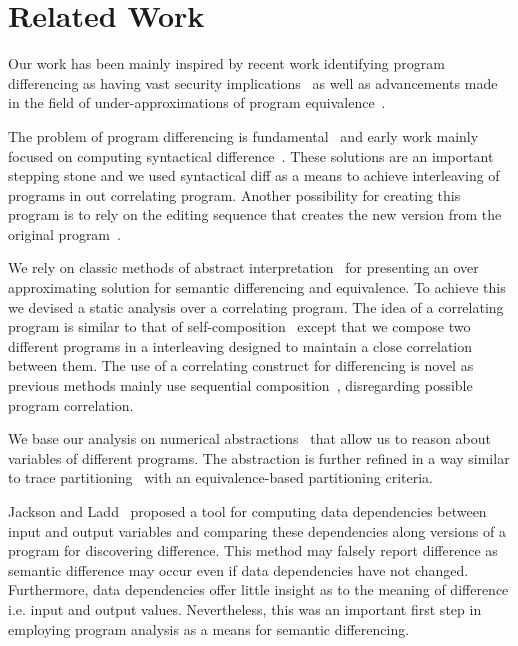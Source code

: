 \section{Related Work} 

Our work has been mainly inspired by recent work identifying program differencing as having vast security implications~\cite{BrumleyPoosankamSongZheng08,SongSunZhang09} as well as advancements made in the field of under-approximations of program equivalence~\cite{GodlinStrichman09,KawaguchiLahiriRebelo10,DwyerElbaumPerson08,EnglerRamos11}.

The problem of program differencing is fundamental~\cite{Hoare69} and early work mainly focused on computing syntactical difference~\cite{HuntMcIlroy75}. These solutions are an important stepping stone and we used syntactical diff as a means to achieve interleaving of programs in out correlating program. Another possibility for creating this program is to rely on the editing sequence that creates the new version from the original program~\cite{Horwitz90}.

We rely on classic methods of abstract interpretation~\cite{CousotCousot77} for presenting an over approximating solution for semantic differencing and equivalence. To achieve this we devised a static analysis over a correlating program. The idea of a correlating program is similar to that of self-composition~\cite{AikenTerauchi05} except that we compose two different programs in a interleaving designed to maintain a close correlation between them. The use of a correlating construct for differencing is novel as previous methods mainly use sequential composition~\cite{GodlinStrichman09,DwyerElbaumPerson08,EnglerRamos11}, disregarding possible program correlation.

We base our analysis on numerical abstractions~\cite{CousotHalbwachs78,Mine2006} that allow us to reason about variables of different programs. The abstraction is further refined in a way similar to trace partitioning~\cite{MauborgneRival07} with an equivalence-based partitioning criteria.

Jackson and Ladd~\cite{JacksonLadd94} proposed a tool for computing data dependencies between input and output variables and comparing these dependencies along versions of a program for discovering difference. This method may falsely report difference as semantic difference may occur even if data dependencies have not changed. Furthermore, data dependencies offer little insight as to the meaning of difference i.e. input and output values. Nevertheless, this was an important first step in employing program analysis as a means for semantic differencing.

